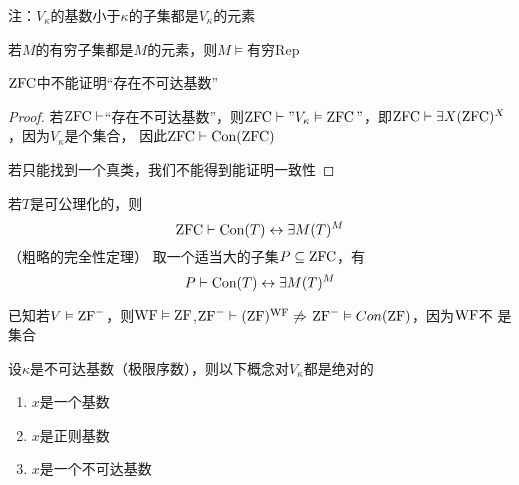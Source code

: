 \documentclass[11pt]{article}
\begin{document}
注：\(V_\kappa\)的基数小于\(\kappa\)的子集都是\(V_\kappa\)的元素

若\(M\)的有穷子集都是\(M\)的元素，则\(M\vDash\)有穷Rep

\begin{corollary}[]
\(\operatorname{ZFC}\)中不能证明“存在不可达基数”
\end{corollary}

\begin{proof}
若\(\operatorname{ZFC}\vdash\)“存在不可达基数”，则\(\operatorname{ZFC}\vdash"V_\kappa\vDash\operatorname{ZFC}"\)，即\(\operatorname{ZFC}\vdash\exists X(\operatorname{ZFC})^X\)，因为\(V_\kappa\)是个集合，
因此\(\operatorname{ZFC}\vdash\text{Con}(\operatorname{ZFC})\)

若只能找到一个真类，我们不能得到能证明一致性
\end{proof}

若\(T\)是可公理化的，则
\begin{equation*}
\operatorname{ZFC}\vdash\text{Con}(T)\leftrightarrow\exists M(T)^M
\end{equation*}
（粗略的完全性定理）
取一个适当大的子集\(P\subseteq\operatorname{ZFC}\)，有
\begin{equation*}
P\vdash\text{Con}(T)\leftrightarrow\exists M(T)^M
\end{equation*}

已知若\(V\vDash\text{ZF}^-\)，则\(\operatorname{WF}\vDash\operatorname{ZF}\),\(\text{ZF}^-\vdash(\operatorname{ZF})^{\operatorname{WF}} \not\Rightarrow\) \(\text{ZF}^-\vDash Con(\operatorname{ZF})\)，因为\(\operatorname{WF}\)不
是集合

\begin{lemma}[]
设\(\kappa\)是不可达基数（极限序数），则以下概念对\(V_\kappa\)都是绝对的
\begin{enumerate}
\item \(x\)是一个基数
\item \(x\)是正则基数
\item \(x\)是一个不可达基数
\end{enumerate}
\end{lemma}
\end{document}
